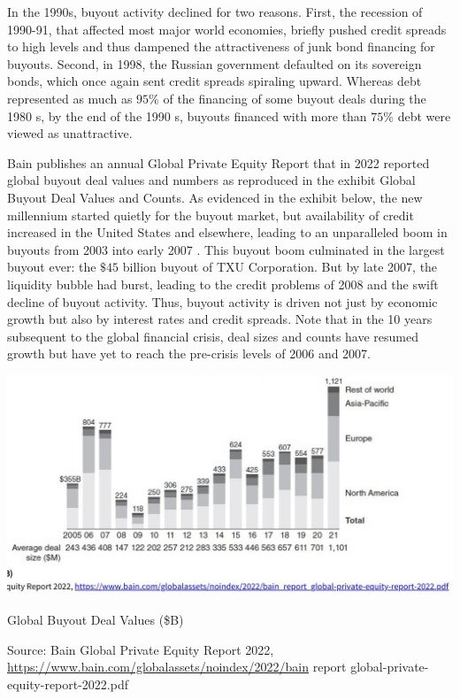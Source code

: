 \documentclass[11pt]{article}
\begin{document}
In the 1990s, buyout activity declined for two reasons. First, the recession of 1990-91, that affected most major world economies, briefly pushed credit spreads to high levels and thus dampened the attractiveness of junk bond financing for buyouts. Second, in 1998, the Russian government defaulted on its sovereign bonds, which once again sent credit spreads spiraling upward. Whereas debt represented as much as $95 \%$ of the financing of some buyout deals during the 1980 s, by the end of the 1990 s, buyouts financed with more than $75 \%$ debt were viewed as unattractive.

Bain publishes an annual Global Private Equity Report that in 2022 reported global buyout deal values and numbers as reproduced in the exhibit Global Buyout Deal Values and Counts. As evidenced in the exhibit below, the new millennium started quietly for the buyout market, but availability of credit increased in the United States and elsewhere, leading to an unparalleled boom in buyouts from 2003 into early 2007 . This buyout boom culminated in the largest buyout ever: the $\$ 45$ billion buyout of TXU Corporation. But by late 2007, the liquidity bubble had burst, leading to the credit problems of 2008 and the swift decline of buyout activity. Thus, buyout activity is driven not just by economic growth but also by interest rates and credit spreads. Note that in the 10 years subsequent to the global financial crisis, deal sizes and counts have resumed growth but have yet to reach the pre-crisis levels of 2006 and 2007.

\begin{center}
\includegraphics[max width=\textwidth]{2024_04_10_9c5a16d2bfd1e32f16c8g-2}
\end{center}

Global Buyout Deal Values (\$B)

Source: Bain Global Private Equity Report 2022, \href{https://www.bain.com/globalassets/noindex/2022/bain}{https://www.bain.com/globalassets/noindex/2022/bain} report global-private-equity-report-2022.pdf
\end{document}

